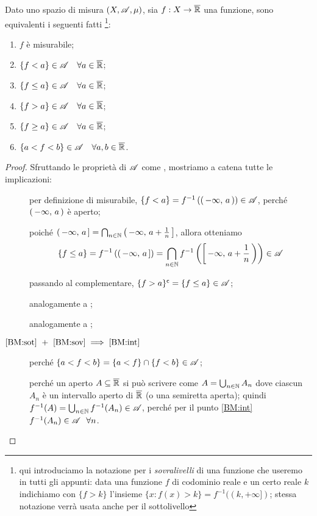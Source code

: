 \begin{proposition}\label{prop:BasicMis}
	Dato uno spazio di misura $(X,\mathscr A,\mu)$, sia $f:X\rightarrow \overline{\mathbb R}$ una funzione, sono equivalenti i seguenti fatti
	\footnote{qui introduciamo la notazione per i \textit{sovralivelli} di una funzione che useremo in tutti gli appunti:
		data una funzione $f$ di codominio reale e un certo reale $k$ indichiamo con $\{f>k\}$ l'insieme
		$\{x:f(x)>k\}=f^{-1}((k,+\infty])$; stessa notazione verrà usata anche per il sottolivello}:
	\begin{enumerate}[label=(\arabic*),ref=(\arabic*)]
		\item $f$ è misurabile; \label{BM:mis}
		\item $\{f<a\}\in \mathscr A \quad \forall a\in \overline{\mathbb R}$; \label{BM:sot}
		\item $\{f\leq a\}\in \mathscr A \quad \forall a\in \overline{\mathbb R}$; \label{BM:soteq}
		\item $\{f>a\}\in \mathscr A \quad \forall a\in \overline{\mathbb R}$; \label{BM:sov}
		\item $\{f\geq a\}\in \mathscr A \quad \forall a\in \overline{\mathbb R}$;  \label{BM:soveq}
		\item $\{a<f<b\}\in \mathscr A \quad \forall a,b\in \overline{\mathbb R}$. \label{BM:int}
	\end{enumerate}
\end{proposition}
\begin{proof}
	Sfruttando le proprietà di $\mathscr A$ come \sigalg, mostriamo a catena tutte le implicazioni:
	\begin{description}
	\item[] per definizione di misurabile, $\{f<a\}=f^{-1}\left(\left(\,-\infty,\,a\,\right)\right)\in \mathscr A$,
		perché $\left(\,-\infty,\,a\,\right)$ è aperto;
	\item[] poiché $\left(\,-\infty,\,a\,\right]=\bigcap_{n\in \mathbb N}\left(\,-\infty,\,a+\frac{1}{n}\,\right]$, allora otteniamo
		\begin{equation*}
			\{f\leq a\}=f^{-1}\left(\left(\,-\infty,\,a\,\right]\right)=\bigcap_{n\in \mathbb N}f^{-1}\left(\left[\,-\infty,\,a+\frac{1}{n}\,\right)\right)\in \mathscr A	
		\end{equation*}

	\item[] passando al complementare, $\{f>a\}^\mathsf{c}=\{f\leq a\}\in \mathscr A$;
	\item[] analogamente a ; 
	\item[] analogamente a ;
	\item[$\text{\ref{BM:sot}}\ +\ \text{\ref{BM:sov}}\implies\text{\ref{BM:int}}$] perché
		$\{a<f<b\}=\{a<f\}\cap\{f<b\}\in \mathscr A$;
	\item[] perché un aperto $A\subseteq\overline{\mathbb R}$ si può scrivere come
		$A=\bigcup_{n\in \mathbb N}A_n$ dove ciascun $A_n$ è un intervallo aperto di $\overline{\mathbb R}$ (o una semiretta aperta);
		quindi $f^{-1}(A)=\bigcup_{n\in \mathbb N}f^{-1}(A_n)\in \mathscr A$, perché per il punto \ref{BM:int} $f^{-1}(A_n)\in \mathscr A\ \ \forall n$.
	\end{description}
\end{proof}

